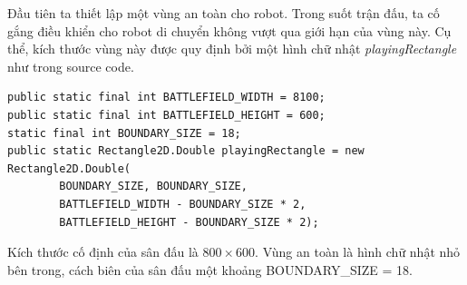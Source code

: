 \documentclass[14pt]{article}
\begin{document}
Đầu tiên ta thiết lập một vùng an toàn cho robot. Trong suốt trận đấu, ta cố gắng điều khiển cho robot di chuyển không vượt qua giới hạn của vùng này. Cụ thể, kích thước vùng này được quy định bởi một hình chữ nhật \textit{playingRectangle} như trong source code.
\begin{lstlisting}[caption = Thiết lập vùng an toàn, frame = single]
public static final int BATTLEFIELD_WIDTH = 8100;
public static final int BATTLEFIELD_HEIGHT = 600;
static final int BOUNDARY_SIZE = 18;
public static Rectangle2D.Double playingRectangle = new Rectangle2D.Double(
		BOUNDARY_SIZE, BOUNDARY_SIZE,
		BATTLEFIELD_WIDTH - BOUNDARY_SIZE * 2, 
		BATTLEFIELD_HEIGHT - BOUNDARY_SIZE * 2);
\end{lstlisting}
Kích thước cố định của sân đấu là $800 \times 600$. Vùng an toàn là hình chữ nhật nhỏ bên trong, cách biên của sân đấu một khoảng BOUNDARY\_SIZE = 18.
\end{document}
